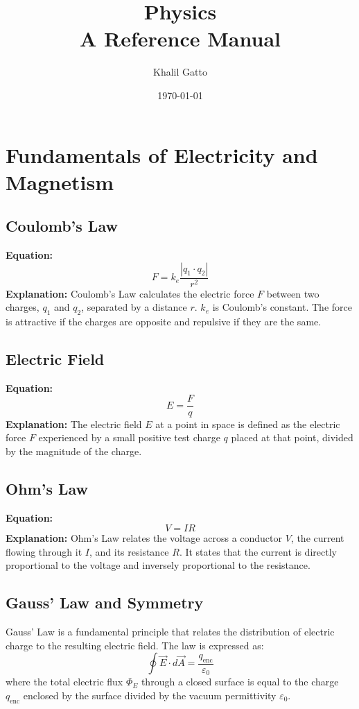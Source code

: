 \documentclass{article}
\title{Physics\\A Reference Manual}
\author{Khalil Gatto}
\date{\today}
\begin{document}
\maketitle


\section*{Fundamentals of Electricity and Magnetism}

\subsection*{Coulomb's Law}
\textbf{Equation:} 
\[ F = k_e \frac{{|q_1 \cdot q_2|}}{{r^2}} \]
\textbf{Explanation:} 
Coulomb's Law calculates the electric force \( F \) between two charges, \( q_1 \) and \( q_2 \), separated by a distance \( r \). \( k_e \) is Coulomb's constant. The force is attractive if the charges are opposite and repulsive if they are the same.



\subsection*{Electric Field}
\textbf{Equation:} 
\[ E = \frac{F}{q} \]
\textbf{Explanation:} 
The electric field \( E \) at a point in space is defined as the electric force \( F \) experienced by a small positive test charge \( q \) placed at that point, divided by the magnitude of the charge.


\subsection*{Ohm's Law}
\textbf{Equation:} 
\[ V = IR \]
\textbf{Explanation:} 
Ohm's Law relates the voltage across a conductor \( V \), the current flowing through it \( I \), and its resistance \( R \). It states that the current is directly proportional to the voltage and inversely proportional to the resistance.

\subsection*{Gauss' Law and Symmetry}
Gauss' Law is a fundamental principle that relates the distribution of electric charge to the resulting electric field. The law is expressed as:
\begin{equation}
    \oint \vec{E} \cdot d\vec{A} = \frac{q_{\text{enc}}}{\varepsilon_0}
\end{equation}
where the total electric flux $\Phi_E$ through a closed surface is equal to the charge $q_{\text{enc}}$ enclosed by the surface divided by the vacuum permittivity $\varepsilon_0$.
\end{document}
